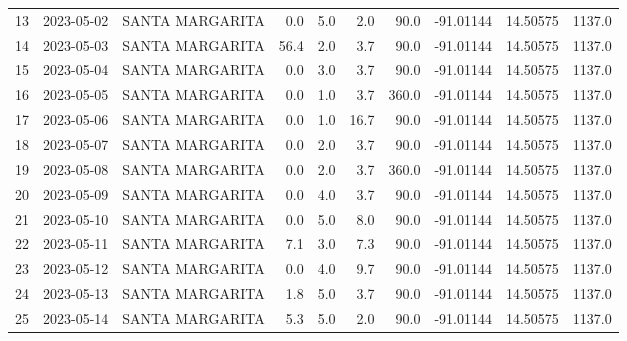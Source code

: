\documentclass[12pt]{article}
\begin{document}
\begin{center}
\begin{tabular}{lllrrrrrrr}
13  & 2023-05-02 &  SANTA MARGARITA &     0.0 &  5.0 &         2.0 &        90.0 & -91.01144 &  14.50575 &   1137.0 \\
14  & 2023-05-03 &  SANTA MARGARITA &    56.4 &  2.0 &         3.7 &        90.0 & -91.01144 &  14.50575 &   1137.0 \\
15  & 2023-05-04 &  SANTA MARGARITA &     0.0 &  3.0 &         3.7 &        90.0 & -91.01144 &  14.50575 &   1137.0 \\
16  & 2023-05-05 &  SANTA MARGARITA &     0.0 &  1.0 &         3.7 &       360.0 & -91.01144 &  14.50575 &   1137.0 \\
17  & 2023-05-06 &  SANTA MARGARITA &     0.0 &  1.0 &        16.7 &        90.0 & -91.01144 &  14.50575 &   1137.0 \\
18  & 2023-05-07 &  SANTA MARGARITA &     0.0 &  2.0 &         3.7 &        90.0 & -91.01144 &  14.50575 &   1137.0 \\
19  & 2023-05-08 &  SANTA MARGARITA &     0.0 &  2.0 &         3.7 &       360.0 & -91.01144 &  14.50575 &   1137.0 \\
20  & 2023-05-09 &  SANTA MARGARITA &     0.0 &  4.0 &         3.7 &        90.0 & -91.01144 &  14.50575 &   1137.0 \\
21  & 2023-05-10 &  SANTA MARGARITA &     0.0 &  5.0 &         8.0 &        90.0 & -91.01144 &  14.50575 &   1137.0 \\
22  & 2023-05-11 &  SANTA MARGARITA &     7.1 &  3.0 &         7.3 &        90.0 & -91.01144 &  14.50575 &   1137.0 \\
23  & 2023-05-12 &  SANTA MARGARITA &     0.0 &  4.0 &         9.7 &        90.0 & -91.01144 &  14.50575 &   1137.0 \\
24  & 2023-05-13 &  SANTA MARGARITA &     1.8 &  5.0 &         3.7 &        90.0 & -91.01144 &  14.50575 &   1137.0 \\
25  & 2023-05-14 &  SANTA MARGARITA &     5.3 &  5.0 &         2.0 &        90.0 & -91.01144 &  14.50575 &   1137.0 \\
\bottomrule
\end{tabular}

        
        \end{center}
        
\end{document}
